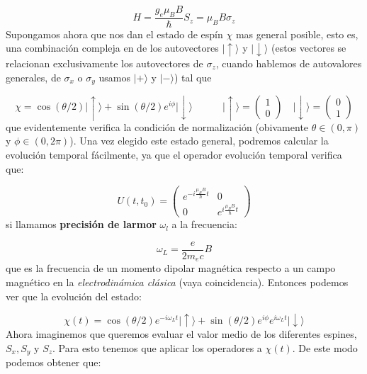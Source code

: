 \documentclass[12pt,a4paper]{book}
\numberwithin{equation}{chapter}
\numberwithin{figure}{chapter}
\newcommand{\tquad}{\quad \quad \quad}
\newcommand{\eup}{\mid \uparrow \rangle}
\newcommand{\edw}{\mid \downarrow \rangle}
\begin{document}
\begin{equation}
H = \frac{g_e \mu_B B}{\hbar} S_z = \mu_B B \sigma_z
\end{equation}
Supongamos ahora que nos dan el estado de espín $\chi$ mas general posible, esto es, una combinación compleja en de los autovectores $\eup$ y $\edw$ (estos vectores se relacionan exclusivamente los autovectores de $\sigma_z$, cuando hablemos de autovalores generales, de $\sigma_x$ o $\sigma_y$ usamos $|+\rangle$ y $|-\rangle$) tal que

\begin{equation}
\chi =  \cos (\theta/2) \eup + \sin (\theta/2) e^{i \phi} \edw \tquad \eup = 
\begin{pmatrix} 
1 \\ 
0 
\end{pmatrix} 
\quad \edw = \begin{pmatrix}
0  \\ 
1 
\end{pmatrix}
\end{equation}
que evidentemente verifica la condición de normalización (obivamente $\theta \in (0,\pi)$ y $\phi \in (0,2\pi)$). Una vez elegido este estado general, podremos calcular la evolución temporal fácilmente, ya que el operador evolución temporal verifica que:

\begin{equation}
U(t,t_0) = \begin{pmatrix}
e^{- i \frac{\mu_B B}{\hbar} t} & 0 \\
0  & e^{ i \frac{\mu_B B}{\hbar} t}
\end{pmatrix}
\end{equation}
si llamamos \textbf{precisión de larmor} $\omega_l$ a la frecuencia:

\begin{equation}
\omega_L = \frac{e}{2 m_e c} B
\end{equation}
que es la frecuencia de un momento dipolar magnética respecto a un campo magnético en la \textit{electrodinámica clásica} (vaya coincidencia). Entonces podemos ver que la evolución del estado:

\begin{equation}
\chi (t) =  \cos (\theta/2) e^{-i\omega_L t} \eup + \sin (\theta/2) e^{i \phi} e^{i \omega_ L t} \edw
\end{equation}
Ahora imaginemos que queremos evaluar el valor medio de los diferentes espines, $S_x,S_y$ y $S_z$. Para esto tenemos que aplicar los operadores a $\chi (t)$. De este modo podemos obtener que:
\end{document}
